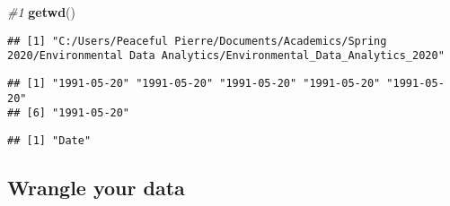 \documentclass[
]{article}
\newenvironment{Shaded}{\begin{snugshade}}{\end{snugshade}}
\newcommand{\CommentTok}[1]{\textcolor[rgb]{0.56,0.35,0.01}{\textit{#1}}}
\newcommand{\DataTypeTok}[1]{\textcolor[rgb]{0.13,0.29,0.53}{#1}}
\newcommand{\KeywordTok}[1]{\textcolor[rgb]{0.13,0.29,0.53}{\textbf{#1}}}
\newcommand{\NormalTok}[1]{#1}
\newcommand{\OperatorTok}[1]{\textcolor[rgb]{0.81,0.36,0.00}{\textbf{#1}}}
\newcommand{\StringTok}[1]{\textcolor[rgb]{0.31,0.60,0.02}{#1}}
\begin{document}
\begin{Shaded}
\begin{Highlighting}[]
\CommentTok{\#1}
\KeywordTok{getwd}\NormalTok{()}
\end{Highlighting}
\end{Shaded}

\begin{verbatim}
## [1] "C:/Users/Peaceful Pierre/Documents/Academics/Spring 2020/Environmental Data Analytics/Environmental_Data_Analytics_2020"
\end{verbatim}

\begin{Shaded}
\end{Shaded}

\begin{verbatim}
## [1] "1991-05-20" "1991-05-20" "1991-05-20" "1991-05-20" "1991-05-20"
## [6] "1991-05-20"
\end{verbatim}

\begin{Shaded}
\end{Shaded}

\begin{verbatim}
## [1] "Date"
\end{verbatim}

\hypertarget{wrangle-your-data}{%
\subsection{Wrangle your data}\label{wrangle-your-data}}
\end{document}
